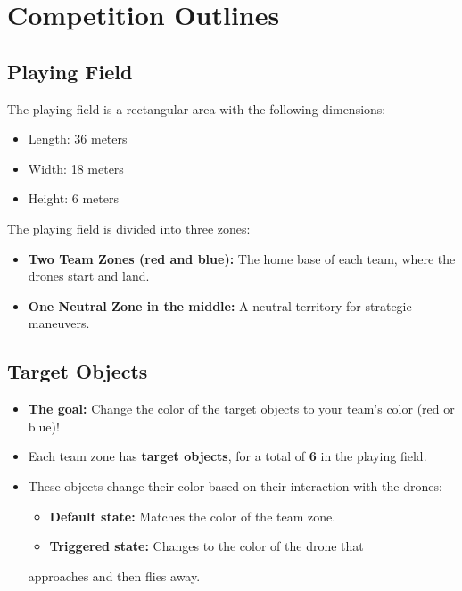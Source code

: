 \section{Competition Outlines}

\subsection{Playing Field}

The playing field is a rectangular area with the following dimensions:

\begin{itemize}
\item Length: 36 meters
\item Width: 18 meters
\item Height: 6 meters
\end{itemize}


The playing field is divided into three zones:
\begin{itemize}
\item \textbf{Two Team Zones (red and blue):} The home base of each team, where the drones start and land.
\item \textbf{One Neutral Zone in the middle:} A neutral territory for strategic maneuvers.
\end{itemize}




\subsection{Target Objects}

\begin{itemize}
\item \textbf{The goal:} Change the color of the target objects to your team's color (red or blue)!
\item Each team zone has \textbf{target objects}, for a total of \textbf{6} in the playing field.
\item These objects change their color based on their interaction with the drones:
\begin{itemize}
    \item \textbf{Default state:} Matches the color of the team zone.
    \item \textbf{Triggered state:} Changes to the color of the drone that
\end{itemize}
 approaches and then flies away.
\end{itemize}



